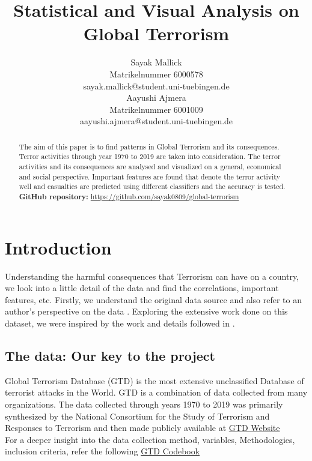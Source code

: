 \documentclass{article}
\title{Statistical and Visual Analysis on Global Terrorism}
\author{%
Sayak Mallick \\
Matrikelnummer 6000578 \\
sayak.mallick@student.uni-tuebingen.de \\
\And
Aayushi Ajmera \\
Matrikelnummer 6001009 \\
aayushi.ajmera@student.uni-tuebingen.de \\
}
\begin{document}
\maketitle

\begin{abstract}
The aim of this paper is to find patterns in Global Terrorism and its consequences. Terror activities through year 1970 to 2019 are taken into consideration. The terror activities and its consequences are analysed and visualized on a general, economical and social perspective. Important features are found that denote the terror activity well and casualties are predicted using different classifiers and the accuracy is tested. 
\textbf{GitHub repository:} \url{https://github.com/sayak0809/global-terrorism}
\end{abstract}

\section{Introduction}
Understanding the harmful consequences that Terrorism can have on a country, we look into a little detail of the data and find the correlations, important features, etc.
Firstly, we understand the original data source and also refer to an author's perspective on the data \cite{gtd}. Exploring the extensive work done on this dataset, we were inspired by the work and details followed in \cite{terror2021}.
\subsection{The data: Our key to the project}
Global Terrorism Database (GTD) is the most extensive unclassified Database of terrorist attacks in the World. GTD is a combination of data collected from many organizations. The data collected through years 1970 to 2019 was primarily synthesized by the National Consortium for the Study of Terrorism and Responses to Terrorism and then made publicly available at \href{https://www.start.umd.edu/gtd/}{GTD Website}
\\For a deeper insight into the data collection method, variables, Methodologies, inclusion criteria, refer the following \href{https://www.start.umd.edu/gtd/downloads/Codebook.pdf}{GTD Codebook}
\end{document}
